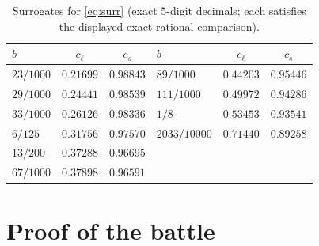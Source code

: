 \documentclass[11pt]{article}
\theoremstyle{remark}
\begin{document}
\begin{table}[h]\centering
\caption{Surrogates for \eqref{eq:surr} (exact $5$-digit decimals;
each satisfies the displayed exact rational comparison).}\label{tab:surr}
\begin{tabular}{lcc@{\qquad}lcc}
\toprule
$b$ & $c_\ell$ & $c_s$ & $b$ & $c_\ell$ & $c_s$\\
\midrule
$23/1000$ & $0.21699$ & $0.98843$ & $89/1000$ & $0.44203$ & $0.95446$\\
$29/1000$ & $0.24441$ & $0.98539$ & $111/1000$ & $0.49972$ & $0.94286$\\
$33/1000$ & $0.26126$ & $0.98336$ & $1/8$ & $0.53453$ & $0.93541$\\
$6/125$ & $0.31756$ & $0.97570$ & $2033/10000$ & $0.71440$ & $0.89258$\\
$13/200$ & $0.37288$ & $0.96695$ & & &\\
$67/1000$ & $0.37898$ & $0.96591$ & & &\\
\bottomrule
\end{tabular}
\end{table}

\section{Proof of the battle}
\end{document}
